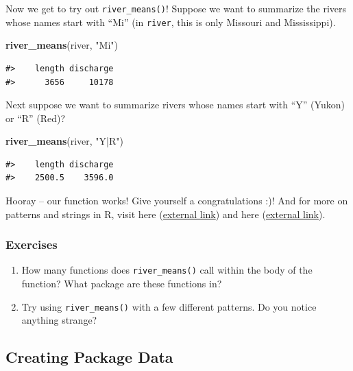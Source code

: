 \documentclass[
]{book}
\newenvironment{Shaded}{\begin{snugshade}}{\end{snugshade}}
\newcommand{\KeywordTok}[1]{\textcolor[rgb]{0.13,0.29,0.53}{\textbf{#1}}}
\newcommand{\NormalTok}[1]{#1}
\newcommand{\StringTok}[1]{\textcolor[rgb]{0.31,0.60,0.02}{#1}}
\begin{document}
Now we get to try out \texttt{river\_means()}! Suppose we want to summarize the rivers whose names start with ``Mi'' (in \texttt{river}, this is only Missouri and Mississippi).

\begin{Shaded}
\begin{Highlighting}[]
\KeywordTok{river_means}\NormalTok{(river, }\StringTok{"Mi"}\NormalTok{)}
\end{Highlighting}
\end{Shaded}

\begin{verbatim}
#>    length discharge 
#>      3656     10178
\end{verbatim}

Next suppose we want to summarize rivers whose names start with ``Y'' (Yukon) or ``R'' (Red)?

\begin{Shaded}
\begin{Highlighting}[]
\KeywordTok{river_means}\NormalTok{(river, }\StringTok{"Y|R"}\NormalTok{)}
\end{Highlighting}
\end{Shaded}

\begin{verbatim}
#>    length discharge 
#>    2500.5    3596.0
\end{verbatim}

Hooray -- our function works! Give yourself a congratulations :)! And for more on patterns and strings in R, visit here (\href{https://r4ds.had.co.nz/strings.html}{external link}) and here (\href{https://bookdown.org/rdpeng/rprogdatascience/regular-expressions.html\#sub-and-gsub}{external link}).

\hypertarget{ex-set2}{%
\subsubsection{Exercises}\label{ex-set2}}

\begin{enumerate}
\def\labelenumi{\arabic{enumi}.}
\item
  How many functions does \texttt{river\_means()} call within the body of the function? What package are these functions in?
\item
  Try using \texttt{river\_means()} with a few different patterns. Do you notice anything strange?
\end{enumerate}

\hypertarget{creating-data}{%
\subsection{Creating Package Data}\label{creating-data}}
\end{document}
